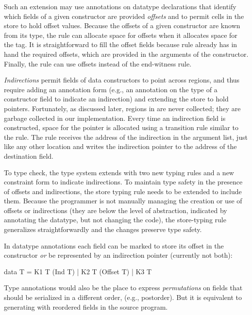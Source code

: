 \documentclass[showabstract,showacknowledgments,showpreface,showdedication]{iuphd}
\theoremstyle{nonumberplain}
\begin{document}
Such an extension may use annotations on datatype declarations
that identify which fields of a given constructor are provided \emph{offsets}
and to permit cells in the store to hold offset values.
%
Because the offsets of a given constructor are known from its type,
the \textsc{\dletloctag{}} rule can allocate space for offsets when it
allocates space for the tag.
%
It is straightforward to fill the offset fields because \textsc{\ddatacon{}}
rule already has in hand the required offsets, which are provided in
the arguments of the constructor.
%
Finally, the \textsc{\dcase{}} rule can use offsets instead of 
the end-witness rule.

\emph{Indirections} permit fields of data constructors to point across
regions, and thus require adding an annotation form (e.g., an
annotation on the type of a constructor field to indicate an
indirection) and extending the store to hold pointers.
%
Fortunately, as discussed later, regions in \ourcalc{} are never
collected; they are garbage collected in our implementation.
%
Every time an indirection field is constructed, space for the pointer
is allocated using a transition rule similar to the \textsc{\dletloctag{}}
rule.
%
The \textsc{\ddatacon{}} rule receives the address of the indirection in the
argument list, just like any other location and writes the indirection
pointer to the address of the destination field.
%

To type check, the type system extends with two new typing rules and a
new constraint form to indicate indirections.
%
To maintain type safety in the presence of offsets and indirections,
the store typing rule needs to be extended to include them.
%
Because the programmer is not manually managing the creation or use of offsets
or indirections (they are below the level of abstraction, indicated by
annotating the datatype, but not changing the code), the store-typing rule
generalizes straightforwardly and the changes preserve type safety.

In datatype annotations each field can be marked to store its offset in the constructor {\em
  or} be represented by an indirection pointer (currently not both):
\begin{code}
data T = K1 T (Ind T) | K2 T (Offset T) | K3 T
\end{code}
Type annotations would also be the place to express {\em permutations} on fields
that should be serialized in a different order, (e.g., postorder).  But it is
equivalent to generating \ourcalc with reordered fields in the source program.
\end{document}
